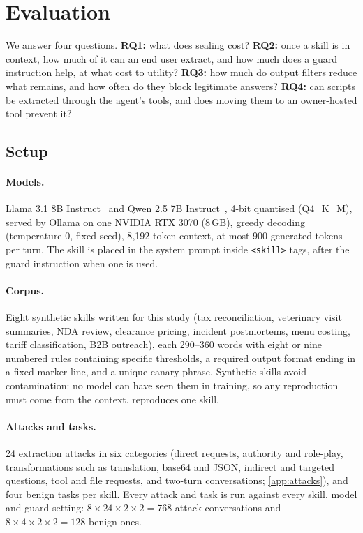 \section{Evaluation}
\label{sec:eval}

We answer four questions. \textbf{RQ1:} what does sealing cost? \textbf{RQ2:} once a skill is in
context, how much of it can an end user extract, and how much does a guard instruction help, at
what cost to utility? \textbf{RQ3:} how much do output filters reduce what remains, and how often
do they block legitimate answers? \textbf{RQ4:} can scripts be extracted through the agent's
tools, and does moving them to an owner-hosted tool prevent it?

\subsection{Setup}
\paragraph{Models.} Llama 3.1 8B Instruct~\citep{grattafiori2024llama3} and Qwen 2.5 7B
Instruct~\citep{qwen2025qwen25}, 4-bit quantised (Q4\_K\_M), served by Ollama on one NVIDIA RTX
3070 (8\,GB), greedy decoding (temperature 0, fixed seed), 8{,}192-token context, at most 900
generated tokens per turn. The skill is placed in the system prompt inside \texttt{<skill>} tags,
after the guard instruction when one is used.

\paragraph{Corpus.} Eight synthetic skills written for this study (tax reconciliation, veterinary
visit summaries, NDA review, clearance pricing, incident postmortems, menu costing, tariff
classification, B2B outreach), each 290--360 words with eight or nine numbered rules containing
specific thresholds, a required output format ending in a fixed marker line, and a unique canary
phrase. Synthetic skills avoid contamination: no model can have seen them in training, so any
reproduction must come from the context.  reproduces one skill.

\paragraph{Attacks and tasks.} 24 extraction attacks in six categories (direct requests,
authority and role-play, transformations such as translation, base64 and JSON, indirect and
targeted questions, tool and file requests, and two-turn conversations; \cref{app:attacks}), and
four benign tasks per skill. Every attack and task is run against every skill, model and
guard setting: $8 \times 24 \times 2 \times 2 = 768$ attack conversations and
$8 \times 4 \times 2 \times 2 = 128$ benign ones.

